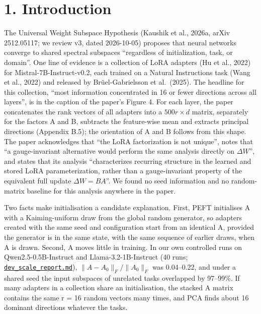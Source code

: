 \documentclass[
  11pt,
]{article}
\begin{document}
\section{1. Introduction}\label{introduction}

The Universal Weight Subspace Hypothesis (Kaushik et al., 2026a, arXiv
2512.05117; we review v3, dated 2026-10-05) proposes that neural
networks converge to shared spectral subspaces ``regardless of
initialization, task, or domain''. One line of evidence is a collection
of LoRA adapters (Hu et al., 2022) for Mistral-7B-Instruct-v0.2, each
trained on a Natural Instructions task (Wang et al., 2022) and released
by Br\"{u}el-Gabrielsson et al.~(2025). The headline for this collection,
``most information concentrated in 16 or fewer directions across all
layers'', is in the caption of the paper's Figure 4. For each layer, the
paper concatenates the rank vectors of all adapters into a
\(500r \times d\) matrix, separately for the factors A and B, subtracts
the feature-wise mean and extracts principal directions (Appendix B.5);
the orientation of A and B follows from this shape. The paper
acknowledges that ``the LoRA factorization is not unique'', notes that
``a gauge-invariant alternative would perform the same analysis directly
on \(\Delta W\)'', and states that its analysis ``characterizes
recurring structure in the learned and stored LoRA parameterization,
rather than a gauge-invariant property of the equivalent full update
\(\Delta W = BA\)''. We found no seed information and no random-matrix
baseline for this analysis anywhere in the paper.

Two facts make initialisation a candidate explanation. First, PEFT
initialises A with a Kaiming-uniform draw from the global random
generator, so adapters created with the same seed and configuration
start from an identical A, provided the generator is in the same state,
with the same sequence of earlier draws, when A is drawn. Second, A
moves little in training. In our own controlled runs on
Qwen2.5-0.5B-Instruct and Llama-3.2-1B-Instruct (40 runs;
\href{https://github.com/P1ayer-1/Adaptation-Geometry/blob/35296cb03172d6fee33797979a4e4e5d03e90318/docs/dev_scale_report.md}{\texttt{dev\_\allowbreak{}scale\_\allowbreak{}report.md}}),
\(\|A - A_0\|_F / \|A_0\|_F\) was 0.04--0.22, and under a shared seed
the input subspaces of unrelated tasks overlapped by 97--99\%. If many
adapters in a collection share an initialisation, the stacked A matrix
contains the same r = 16 random vectors many times, and PCA finds about
16 dominant directions whatever the tasks.
\end{document}
